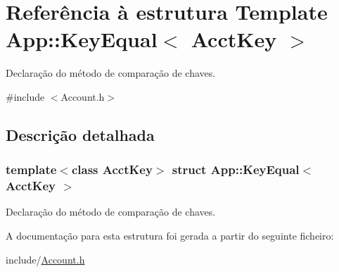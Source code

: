 \hypertarget{structApp_1_1KeyEqual}{}\section{Referência à estrutura Template App\+:\+:Key\+Equal$<$ Acct\+Key $>$}
\label{structApp_1_1KeyEqual}


Declaração do método de comparação de chaves.  




{\ttfamily \#include $<$Account.\+h$>$}



\subsection{Descrição detalhada}
\subsubsection*{template$<$class Acct\+Key$>$\newline
struct App\+::\+Key\+Equal$<$ Acct\+Key $>$}

Declaração do método de comparação de chaves. 

A documentação para esta estrutura foi gerada a partir do seguinte ficheiro\+:\begin{DoxyCompactItemize}
\item 
include/\hyperlink{Account_8h}{Account.\+h}\end{DoxyCompactItemize}
